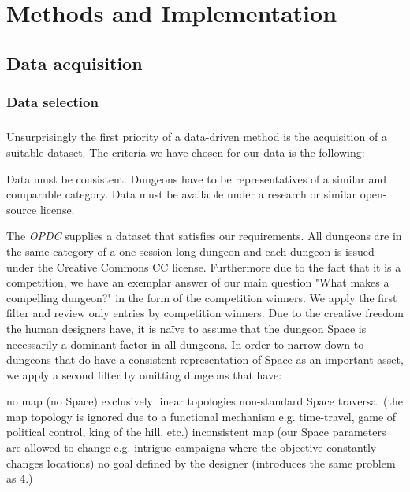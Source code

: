\documentclass{UoYCSproject}
\begin{document}
\chapter{Methods and Implementation}
\section{Data acquisition}
\subsection{Data selection} %
\paragraph{}
Unsurprisingly the first priority of a data-driven method is the acquisition of a suitable dataset. The criteria we have chosen for our data is the following:
\begin{outline}[enumerate]
  \1 Data must be consistent. Dungeons have to be representatives of a similar and comparable category.
  \1 Data must be available under a research or similar open-source license.
\end{outline}
The \textit{OPDC} supplies a dataset that satisfies our requirements. All dungeons are in the same category of a one-session long dungeon and each dungeon is issued under the Creative Commons CC license. Furthermore due to the fact that it is a competition, we have an exemplar answer of our main question "What makes a compelling dungeon?" in the form of the competition winners. We apply the first filter and review only entries by competition winners. Due to the creative freedom the human designers have, it is na\"{i}ve to assume that the dungeon Space is necessarily a dominant factor in all dungeons. In order to narrow down to dungeons that do have a consistent representation of Space as an important asset, we apply a second filter by omitting dungeons that have:
\begin{outline}[enumerate]
  \1 no map (no Space)
  \1 exclusively linear topologies
  \1 non-standard Space traversal (the map topology is ignored due to a functional mechanism e.g. time-travel, game of political control, king of the hill, etc.)
  \1 inconsistent map (our Space parameters are allowed to change e.g. intrigue campaigns where the objective constantly changes locations)
  \1 no goal defined by the designer (introduces the same problem as 4.)
\end{outline}
\end{document}
